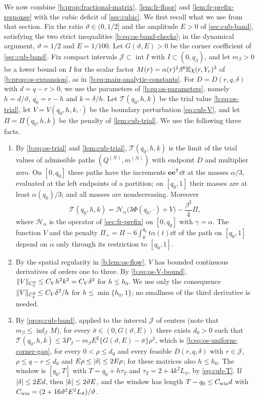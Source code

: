 We now combine \cref{b:prop:fractional-matrix}, \cref{lem:fr-floor} and \cref{lem:fr-prefix-response} with the cubic deficit of \cref{sec:cubic}. We first recall what we use from that section. Fix the ratio $\vartheta\in(0,1/2]$ and the amplitude $E>0$ of \cref{sec:cub-band}, satisfying the two strict inequalities \eqref{b:eq:os-band-checks}; in the dynamical argument, $\vartheta=1/2$ and $E=1/100$. Let $G(\vartheta,E)>0$ be the corner coefficient of \cref{sec:cub-band}. Fix compact intervals $\mathcal J\subset\operatorname{int}I$ with $I\subset(0,q_\beta)$, and let $m_\beta>0$ be a lower bound on $I$ for the scalar factor $M(r)=\alpha(r)^2\beta^6\mathbb E\chi(r,Y_r)^3$ of \cref{b:prop:os-expansion}, as in \eqref{b:eq:main-analytic-constants}. For $D=D(r,q,\delta)$ with $d=q-r>0$, we use the parameters of \eqref{b:eq:os-parameters}, namely $h=d/\vartheta$, $q_0=r-h$ and $k=\delta/h$. Let $\mathcal T(q_0,h,k)$ be the trial value \eqref{b:eq:os-trial}, let $V=V(q_0,h,k,\cdot)$ be the boundary perturbation \eqref{eq:cub-V}, and let $\Pi=\Pi(q_0,h,k)$ be the penalty of \cref{lem:cub-trial}. We use the following three facts.
\begin{enumerate}
\item[(T1)] By \eqref{b:eq:os-trial} and \cref{lem:cub-trial}, $\mathcal T(q_0,h,k)$ is the limit of the trial values of admissible paths $(Q^{(N)},m^{(N)})$ with endpoint $D$ and multiplier zero. On $[0,q_0]$ these paths have the increments $\mathbf e\mathbf e^{\mathsf T}\dd t$ at the masses $\alpha/3$, evaluated at the left endpoints of a partition; on $[q_0,1]$ their masses are at least $\alpha(q_0)/3$; and all masses are nondecreasing. Moreover
\[
 \mathcal T(q_0,h,k)=\mathcal H_\alpha\bigl(3\Phi(q_0,\cdot)+V\bigr)-\frac{\beta^2}4\Pi,
\]
where $\mathcal H_\alpha$ is the operator of \cref{sec:fr-prefix} on $[0,q_0]$ with $\gamma=\alpha$. The function $V$ and the penalty $\Pi_+=\Pi-6\int_0^{q_0}t\alpha(t)\dd t$ of the path on $[q_0,1]$ depend on $\alpha$ only through its restriction to $[q_0,1]$.
\item[(T2)] By the spatial regularity in \cref{b:lem:os-flow}, $V$ has bounded continuous derivatives of orders one to three. By \eqref{b:eq:os-V-bound}, $\lVert V\rVert_{C^2_b}\le C_Vh^2k^2=C_V\delta^2$ for $h\le h_0$. We use only the consequence $\lVert V\rVert_{C^2_b}\le C_V\delta^2/h$ for $h\le\min\{h_0,1\}$; no smallness of the third derivative is needed.
\item[(T3)] By \cref{prop:cub-band}, applied to the interval $\mathcal J$ of centers (note that $m_\beta\le\inf_{\mathcal J}M$), for every $\bar\sigma\in(0,G(\vartheta,E))$ there exists $d_0>0$ such that $\mathcal T(q_0,h,k)\le3P_\beta-m_\beta E^2\{G(\vartheta,E)-\bar\sigma\}\rho^3$, which is \eqref{b:eq:os-uniform-corner-gap}, for every $0<\rho\le d_0$ and every feasible $D(r,q,\delta)$ with $r\in\mathcal J$, $\rho\le q-r\le d_0$ and $E\rho\le\lvert \delta\rvert\le2E\rho$; for these matrices also $h\le h_0$. The window is $[q_0,T]$ with $T=q_0+h\tau_T$ and $\tau_T=2+4k^2L_\vartheta$, by \eqref{eq:cub-T}. If $\lvert \delta\rvert\le2Ed$, then $\lvert k\rvert\le2\vartheta E$, and the window has length $T-q_0\le C_{\rm win}d$ with $C_{\rm win}=(2+16\vartheta^2E^2L_\vartheta)/\vartheta$.
\end{enumerate}
